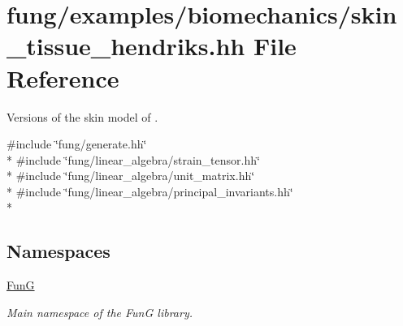 \hypertarget{skin__tissue__hendriks_8hh}{\section{fung/examples/biomechanics/skin\-\_\-tissue\-\_\-hendriks.hh File Reference}
\label{skin__tissue__hendriks_8hh}
}


Versions of the skin model of \cite{Hendriks2005}.  


{\ttfamily \#include \char`\"{}fung/generate.\-hh\char`\"{}}\\*
{\ttfamily \#include \char`\"{}fung/linear\-\_\-algebra/strain\-\_\-tensor.\-hh\char`\"{}}\\*
{\ttfamily \#include \char`\"{}fung/linear\-\_\-algebra/unit\-\_\-matrix.\-hh\char`\"{}}\\*
{\ttfamily \#include \char`\"{}fung/linear\-\_\-algebra/principal\-\_\-invariants.\-hh\char`\"{}}\\*
\subsection*{Namespaces}
\begin{DoxyCompactItemize}
\item 
\hyperlink{namespaceFunG}{Fun\-G}
\begin{DoxyCompactList}\small\item\em Main namespace of the Fun\-G library. \end{DoxyCompactList}\end{DoxyCompactItemize}
